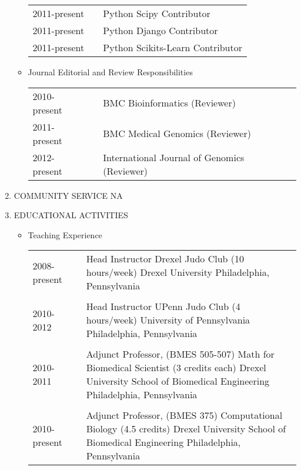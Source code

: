 \documentclass[a4paper,10pt]{article}
\begin{document}
\begin{enumerate}
\begin{itemize}
\begin{longtable}{p{}p{}p{}}
  2011-present & & Python Scipy Contributor \\
  2011-present & & Python Django Contributor \\
  2011-present & & Python Scikits-Learn Contributor \\
  \end{longtable}
  \item[] Journal Editorial and Review Responsibilities
  \begin{longtable}{p{}p{}p{}}
  2010-present & & BMC Bioinformatics (Reviewer) \\
  2011-present & & BMC Medical Genomics (Reviewer) \\
  2012-present & & International Journal of Genomics (Reviewer) \\
  \end{longtable}
 \end{itemize}
 \item COMMUNITY SERVICE \newline
 NA
 \item EDUCATIONAL ACTIVITIES
 \begin{itemize}
  \item[] Teaching Experience
   \begin{longtable}{p{}p{}p{}}
  2008-present & & Head Instructor \newline Drexel Judo Club (10 hours/week) \newline Drexel University \newline Philadelphia, Pennsylvania \\
  \\
  2010-2012 & & Head Instructor \newline UPenn Judo Club (4 hours/week) \newline University of Pennsylvania \newline Philadelphia, Pennsylvania \\
  \\
  2010-2011 & & Adjunct Professor, (BMES 505-507) \newline Math for Biomedical Scientist (3 credits each) \newline Drexel University School of Biomedical Engineering \newline Philadelphia, Pennsylvania \\
  \\
  2010-present & & Adjunct Professor, (BMES 375) \newline Computational Biology (4.5 credits) \newline Drexel University School of Biomedical Engineering \newline Philadelphia, Pennsylvania \\

\end{longtable}
\end{itemize}
\end{enumerate}
\end{document}
